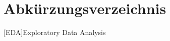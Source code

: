 \chapter*{Abkürzungsverzeichnis} 

\begin{acronym}
	
	[EDA]{Exploratory Data Analysis}
	
\end{acronym}

